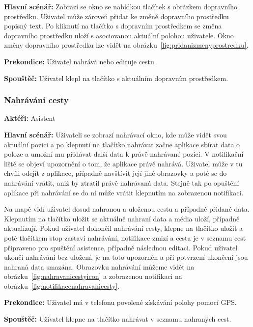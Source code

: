 \documentclass[czech,master,public,dept460,male,java,cpdeclaration]{diploma}
\newcommand{\usecase}[2]{\subsubsection{#1}\label{#2}}
\begin{document}
\vspace{0.1cm}
\noindent
\textbf{Hlavní scénář:} Zobrazí se okno se nabídkou tlačítek s obrázkem dopravního prostředku.
Uživatel může zároveň přidat ke změně dopravního prostředku popisný text. Po kliknutí na
tlačítko s dopravním prostředkem se změna dopravního prostředku uloží s asociovanou aktuální polohou
uživatele. Okno změny dopravního prostředku lze vidět na obrázku~\ref{fig:pridanizmenyprostredku}.

\vspace{0.1cm}
\noindent
\textbf{Prekondice:} Uživatel nahrává nebo edituje cestu.

\vspace{0.1cm}
\noindent
\textbf{Spouštěč:} Uživatel klepl na tlačítko s aktuálním dopravním prostředkem.




\usecase{Nahrávání cesty}{nahravanicesty}
\textbf{Aktéři:} Asistent

\vspace{0.1cm}
\noindent
\textbf{Hlavní scénář:} Uživateli se zobrazí nahrávací okno, kde může vidět svou aktuální pozici
a po klepnutí na tlačítko nahrávat začne aplikace sbírat data o poloze a umožní mu přidávat další data
k právě nahrávané pozici. V notifikační liště se objeví upozornění o tom, že aplikace právě nahrává.
Uživatel může v tu chvíli odejít z aplikace, případně navštívit její jiné obrazovky a poté se do nahrávání vrátit,
aniž by ztratil právě nahrávaná data. Stejně tak po opuštění aplikace při nahrávání se do ní může vrátit
klepnutím na zobrazenou notifikaci.

Na mapě vidí uživatel dosud nahranou a uloženou cestu a případné přidané data.
Klepnutím na tlačítko uložit se aktuálně nahraní data a média uloží, případně aktualizují.
Pokud uživatel dokončil nahrávání cesty, klepne na tlačítko uložit a poté tlačítkem stop zastaví nahrávání,
notifikace zmizí a cesta je v seznamu cest připraveno pro spuštění asistence, případně následnou editaci.
Pokud uživatel ukončí nahrávání bez uložení, je na toto upozorněn a při potvrzení ukončení jsou nahraná data
smazána. Obrazovku nahrávání můžeme vidět na obrázku~\ref{fig:nahravanicestyicon} a zobrazenou notifikaci
na obrázku~\ref{fig:notifikacenahravanicesty}.

\vspace{0.1cm}
\noindent
\textbf{Prekondice:} Uživatel má v telefonu povolené získávání polohy pomocí GPS.

\vspace{0.1cm}
\noindent
\textbf{Spouštěč:} Uživatel klepne na tlačítko nahrávat v seznamu nahraných cest.
\end{document}
